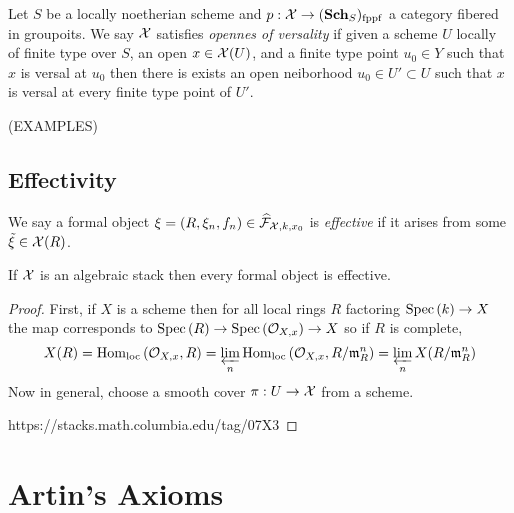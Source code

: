 \documentclass[12pt]{article}
\begin{document}
\begin{defn}
Let $S$ be a locally noetherian scheme and $p : \mathcal{X} \to (\mathbf{Sch}_S)_{\mathrm{fppf}}$ a category fibered in groupoits. We say $\mathcal{X}$ satisfies \textit{opennes of versality} if given a scheme $U$ locally of finite type over $S$, an open $x \in \mathcal{X}(U)$, and a finite type point $u_0 \in Y$ such that $x$ is versal at $u_0$ then there is exists an open neiborhood $u_0 \in U' \subset U$ such that $x$ is versal at every finite type point of $U'$.
\end{defn}

(EXAMPLES)

\subsection{Effectivity}

\begin{defn}
We say a formal object $\xi = (R, \xi_n, f_n) \in \widehat{\mathcal{F}}_{\mathcal{X}, k, x_0}$ is \textit{effective} if it arises from some $\tilde{\xi} \in \mathcal{X}(R)$.
\end{defn}

\begin{lemma}
If $\mathcal{X}$ is an algebraic stack then every formal object is effective.
\end{lemma}

\begin{proof}
First, if $X$ is a scheme then for all local rings $R$ factoring $\mathrm{Spec}\left( k \right) \to X$ the map corresponds to $\mathrm{Spec}\left( R \right) \to \mathrm{Spec}\left( \mathcal{O}_{X, x} \right) \to X$ so if $R$ is complete,
\[ X(R) = \mathrm{Hom}_{\text{loc}} \left( \mathcal{O}_{X, x}, R \right) = \varprojlim_{n} \mathrm{Hom}_{\text{loc}} \left( \mathcal{O}_{X, x}, R/\mathfrak{m}_R^n \right) = \varprojlim_n X(R/\mathfrak{m}_R^n) \]
Now in general, choose a smooth cover $\pi : U \to \mathcal{X}$ from a scheme. 

https://stacks.math.columbia.edu/tag/07X3
\end{proof}

\section{Artin's Axioms}
\end{document}
